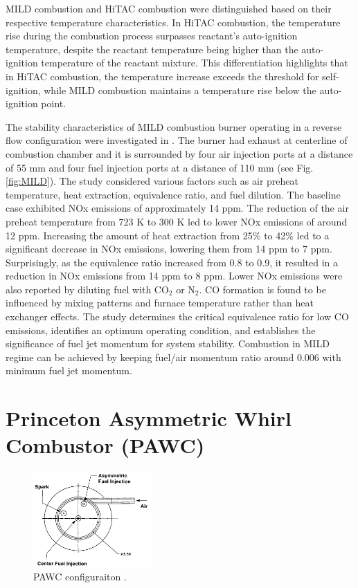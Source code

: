 MILD combustion and HiTAC combustion were distinguished based on their respective temperature characteristics. In HiTAC combustion, the temperature rise during the combustion process surpasses reactant's auto-ignition temperature, despite the reactant temperature being higher than the auto-ignition temperature of the reactant mixture\cite{VAThesis2011}. This differentiation highlights that in HiTAC combustion, the temperature increase exceeds the threshold for self-ignition, while MILD combustion maintains a temperature rise below the auto-ignition point.

The stability characteristics of MILD combustion burner operating in a reverse flow configuration were investigated in \cite{SZEGO2009429}. The burner had exhaust at centerline of combustion chamber and it is surrounded by four air injection ports at a distance of 55 mm and four fuel injection ports at a distance of 110 mm (see Fig. \ref{fig:MILD}). The study considered various factors such as air preheat temperature, heat extraction, equivalence ratio, and fuel dilution. The baseline case exhibited NOx emissions of approximately 14 ppm. The reduction of the air preheat temperature from 723 K to 300 K led to lower NOx emissions of around 12 ppm. Increasing the amount of heat extraction from 25$\%$ to 42$\%$ led to a significant decrease in NOx emissions, lowering them from 14 ppm to 7 ppm. Surprisingly, as the equivalence ratio increased from 0.8 to 0.9, it resulted in a reduction in NOx emissions from 14 ppm to 8 ppm\cite{VAThesis2011}. Lower NOx emissions were also reported by diluting fuel with CO$_2$ or N$_2$. CO formation is found to be influenced by mixing patterns and furnace temperature rather than heat exchanger effects. The study determines the critical equivalence ratio for low CO emissions, identifies an optimum operating condition, and establishes the significance of fuel jet momentum for system stability\cite{MARDANI2024100905}. Combustion in MILD regime can be achieved by keeping fuel/air momentum ratio around 0.006 with minimum fuel jet momentum.

\section{Princeton Asymmetric Whirl Combustor (PAWC)}
\begin{figure}
    \centering
    \includegraphics[width=0.4\textwidth]{Chapter2/Images/PAWC.jpeg}
  \caption[PAWC configuraiton]{PAWC configuraiton \cite{YETTER20001265}.}
  \label{fig:PAWC}
\end{figure}

